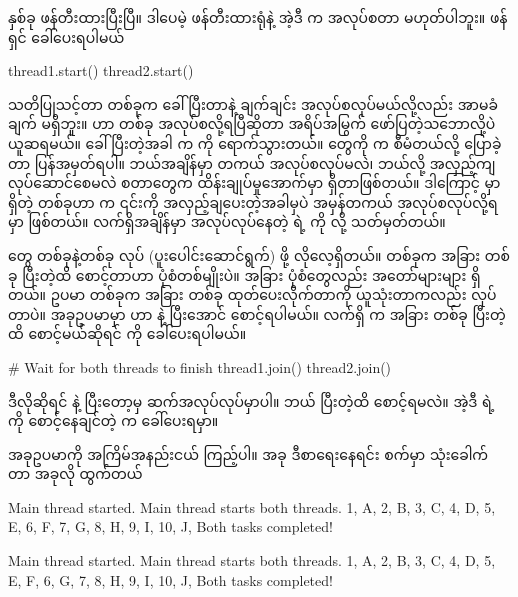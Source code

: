  နှစ်ခု ဖန်တီးထားပြီးပြီ။ ဒါပေမဲ့  ဖန်တီးထားရုံနဲ့ အဲ့ဒီ  က အလုပ်စတာ မဟုတ်ပါဘူး။  ဖန်ရှင် ခေါ်ပေးရပါမယ် 
%
\begin{py}
thread1.start()
thread2.start()
\end{py}
%
သတိပြုသင့်တာ တစ်ခုက  ခေါ်ပြီးတာနဲ့ ချက်ချင်း အလုပ်စလုပ်မယ်လို့လည်း အာမခံချက် မရှိဘူး။  ဟာ  တစ်ခု အလုပ်စလို့ရပြီဆိုတာ အရိပ်အမြွက် ဖော်ပြတဲ့သဘောလို့ပဲ ယူဆရမယ်။  ခေါ်ပြီးတဲ့အခါ  က   ကို ရောက်သွားတယ်။  တွေကို  က စီမံတယ်လို့ ပြောခဲ့တာ ပြန်အမှတ်ရပါ။ ဘယ်အချိန်မှာ တကယ် အလုပ်စလုပ်မလဲ၊ ဘယ်လို့ အလှည့်ကျ လုပ်ဆောင်စေမလဲ စတာတွေက  ထိန်းချုပ်မှုအောက်မှာ ရှိတာဖြစ်တယ်။ ဒါကြောင့်   မှာ ရှိတဲ့  တစ်ခုဟာ  က ၎င်းကို အလှည့်ချပေးတဲ့အခါမှပဲ အမှန်တကယ် အလုပ်စလုပ်လို့ရမှာ ဖြစ်တယ်။ လက်ရှိအချိန်မှာ အလုပ်လုပ်နေတဲ့  ရဲ့  ကို   လို့ သတ်မှတ်တယ်။

 တွေ တစ်ခုနဲ့တစ်ခု  လုပ် (ပူးပေါင်းဆောင်ရွက်) ဖို့ လိုလေ့ရှိတယ်။  တစ်ခုက အခြား  တစ်ခု ပြီးတဲ့ထိ စောင့်တာဟာ  ပုံစံတစ်မျိုးပဲ။ အခြား  ပုံစံတွေလည်း အတော်များများ ရှိတယ်။ ဥပမာ  တစ်ခုက အခြား  တစ်ခု ထုတ်ပေးလိုက်တာကို ယူသုံးတာကလည်း  လုပ်တာပဲ။ အခုဥပမာမှာ  ဟာ  နဲ့  ပြီးအောင် စောင့်ရပါမယ်။ လက်ရှိ  က အခြား  တစ်ခု ပြီးတဲ့ထိ စောင့်မယ်ဆိုရင်  ကို ခေါ်ပေးရပါမယ်။
%
\begin{py}
# Wait for both threads to finish
thread1.join()
thread2.join()
\end{py}
%
ဒီလိုဆိုရင်  နဲ့  ပြီးတော့မှ  ဆက်အလုပ်လုပ်မှာပါ။ ဘယ်  ပြီးတဲ့ထိ စောင့်ရမလဲ။ အဲ့ဒီ  ရဲ့  ကို စောင့်နေချင်တဲ့  က ခေါ်ပေးရမှာ။

အခုဥပမာကို အကြိမ်အနည်းငယ်  ကြည့်ပါ။ အခု ဒီစာရေးနေရင်း  စက်မှာ သုံးခေါက်  တာ အခုလို ထွက်တယ်
%
\begin{vbtm}
Main thread started.
Main thread starts both threads.
1, A, 2, B, 3, C, 4, D, 5, E, 6, F, 7, G, 8, H, 9, I, 10, J, 
Both tasks completed!
\end{vbtm}

%
\begin{vbtm}
Main thread started.
Main thread starts both threads.
1, A, 2, B, 3, C, 4, D, 5, E, F, 6, G, 7, 8, H, 9, I, 10, J, 
Both tasks completed!
\end{vbtm}
%

